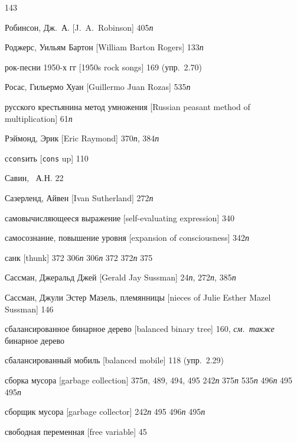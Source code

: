 \begin{theindex}
   143
\item {Робинсон, Дж.~А. [J.~A.~Robinson]} 405{\it п}
\item {Роджерс, Уильям Бартон [William Barton Rogers]} 133{\it п}
\item {рок-песни 1950-х гг [1950s rock songs]} 169 (упр.~2.70)
\item {Росас, Гильермо Хуан [Guillermo Juan Rozas]} 535{\it п}
\item {русского крестьянина метод умножения [Russian peasant method of mul\-ti\-pli\-ca\-tion]} 61{\it п}
\item {Рэймонд, Эрик [Eric Raymond]} 370{\it п}, 384{\it п}
\bigskip
\item {с\texttt{cons}ить [{\tt cons} up]} 110
\item {Савин,~ А.Н.} 22
\item {Сазерленд, Айвен [Ivan Sutherland]} 272{\it п}
\item {самовычисляющееся выражение [self-evaluating expression]} 340
\item {самосознание, повышение уровня [expansion of consciousness]} 342{\it п}
\item {санк [thunk]} 372
   306{\it п}
   306{\it п}
   372
   372{\it п}
   375
\item {Сассман, Джеральд Джей [Gerald Jay Sussman]} 24{\it п}, 272{\it п}, 385{\it п}
\item {Сассман, Джули Эстер Мазель, племянницы [nieces of Julie Esther Mazel Sussman]} 146
\item {сбалансированное бинарное дерево [balanced binary tree]} 160, {\it см.~также} бинарное дерево
\item {сбалансированный мобиль [balanced mobile]} 118 (упр.~2.29)
\item {сборка мусора [garbage collection]} 375{\it п}, 489, 494, 495
   242{\it п}
   375{\it п}
   535{\it п}
   496{\it п}
   495
   495{\it п}
\item {сборщик мусора [garbage collector]} 242{\it п}
   495
   496{\it п}
   495{\it п}
\item {свободная переменная [free variable]} 45

\end{theindex}

